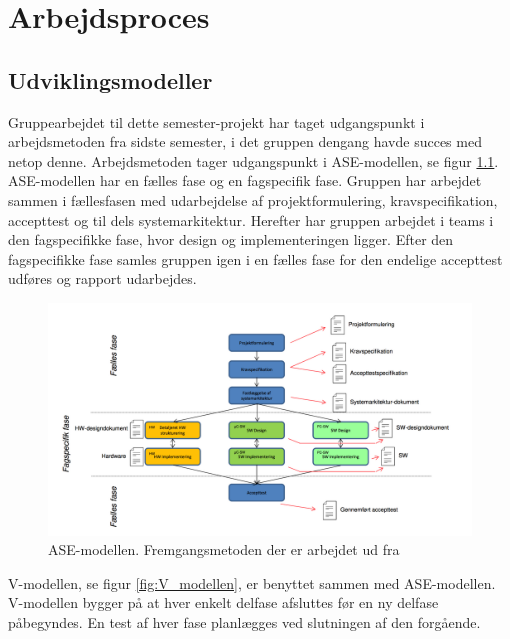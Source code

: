 
\chapter{Arbejdsproces}

\section{Udviklingsmodeller}
Gruppearbejdet til dette semester-projekt har taget udgangspunkt i arbejdsmetoden fra sidste semester, i det gruppen dengang havde succes med netop denne. Arbejdsmetoden tager udgangspunkt i ASE-modellen, se figur \ref{fig:ASE_modellen}. ASE-modellen har en fælles fase og en fagspecifik fase. Gruppen har arbejdet sammen i fællesfasen med udarbejdelse af projektformulering, kravspecifikation, accepttest og til dels systemarkitektur. Herefter har gruppen arbejdet i teams i den fagspecifikke fase, hvor design og implementeringen ligger. Efter den fagspecifikke fase samles gruppen igen i en fælles fase for den endelige accepttest udføres og rapport udarbejdes. 

\begin{figure}[h]
  \centering
    \includegraphics[width=\textwidth]{Billeder/ASE_modellen}
    \caption{ASE-modellen. Fremgangsmetoden der er arbejdet ud fra}
    \label{fig:ASE_modellen}
\end{figure}

V-modellen, se figur \ref{fig:V_modellen}, er benyttet sammen med ASE-modellen. V-modellen bygger på at hver enkelt delfase afsluttes før en ny delfase påbegyndes. En test af hver fase planlægges ved slutningen af den forgående. 

